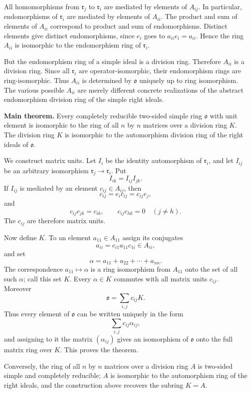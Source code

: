 \documentclass[11pt]{article}
\begin{document}
All homomorphisms from \(\mathfrak r_j\) to \(\mathfrak r_i\) are
mediated by elements of \(A_{ij}\). In particular, endomorphisms of
\(\mathfrak r_i\) are mediated by elements of \(A_{ii}\). The product
and sum of elements of \(A_{ii}\) correspond to product and sum of
endomorphisms. Distinct elements give distinct endomorphisms, since
\(e_i\) goes to \(a_{ii}e_i=a_{ii}\). Hence the ring \(A_{ii}\) is
isomorphic to the endomorphism ring of \(\mathfrak r_i\).

But the endomorphism ring of a simple ideal is a division ring.
Therefore \(A_{ii}\) is a division ring. Since all \(\mathfrak r_i\) are
operator-isomorphic, their endomorphism rings are ring-isomorphic. Thus
\(A_{ii}\) is determined by \(\mathfrak{o}\) uniquely up to ring
isomorphism. The various possible \(A_{ii}\) are merely different
concrete realizations of the abstract endomorphism division ring of the
simple right ideals.

\textbf{Main theorem.} Every completely reducible two-sided simple ring
\(\mathfrak{o}\) with unit element is isomorphic to the ring of all
\(n\) by \(n\) matrices over a division ring \(K\). The division ring
\(K\) is isomorphic to the automorphism division ring of the right
ideals of \(\mathfrak{o}\).

We construct matrix units. Let \(I_i\) be the identity automorphism of
\(\mathfrak r_i\), and let \(I_{ij}\) be an arbitrary isomorphism
\(\mathfrak r_j\to\mathfrak r_i\). Put \[
  I_{ik}=I_{ij}I_{jk}.
\] If \(I_{ij}\) is mediated by an element \(c_{ij}\in A_{ij}\), then \[
  c_{ij}=e_i c_{ij}=c_{ij}e_j,
\] and \[
  c_{ij}c_{jk}=c_{ik},
  \qquad
  c_{ij}c_{hk}=0\quad(j\ne h).
\] The \(c_{ij}\) are therefore matrix units.

Now define \(K\). To an element \(a_{11}\in A_{11}\) assign its
conjugates \[
  a_{ii}=c_{i1}a_{11}c_{1i}\in A_{ii},
\] and set \[
  \alpha=a_{11}+a_{22}+\cdots+a_{nn}.
\] The correspondence \(a_{11}\mapsto\alpha\) is a ring isomorphism from
\(A_{11}\) onto the set of all such \(\alpha\); call this set \(K\).
Every \(\alpha\in K\) commutes with all matrix units \(c_{ij}\).
Moreover \[
  \mathfrak{o}=\sum_{i,j} c_{ij}K.
\] Thus every element of \(\mathfrak{o}\) can be written uniquely in the
form \[
  \sum_{i,j} c_{ij}\alpha_{ij},
\] and assigning to it the matrix \((\alpha_{ij})\) gives an isomorphism
of \(\mathfrak{o}\) onto the full matrix ring over \(K\). This proves
the theorem.

Conversely, the ring of all \(n\) by \(n\) matrices over a division ring
\(A\) is two-sided simple and completely reducible; \(A\) is isomorphic
to the automorphism ring of the right ideals, and the construction above
recovers the subring \(K=A\).
\end{document}
